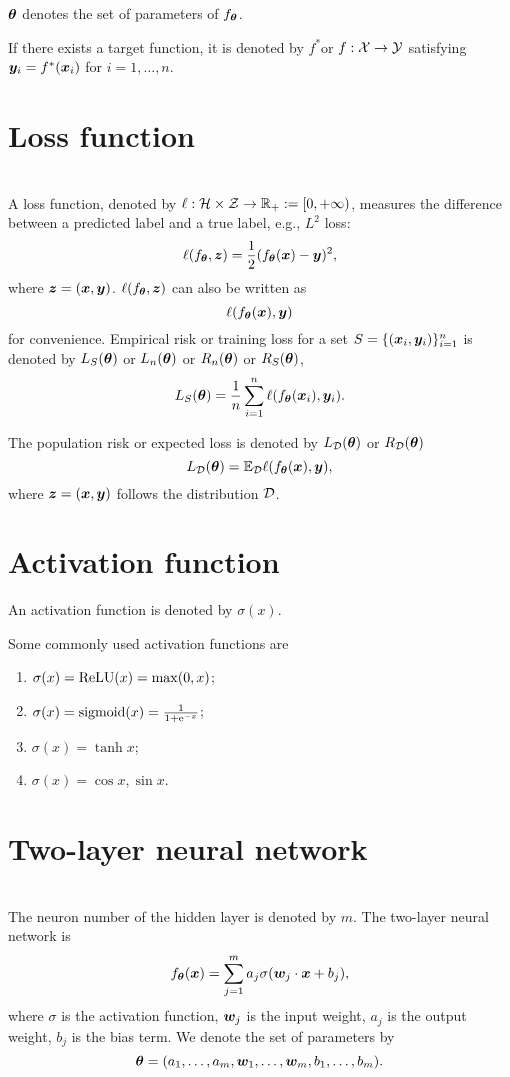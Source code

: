 \documentclass{article}
\begin{document}
$\bm{\theta}$  denotes the set of parameters of  $f_{\bm{\theta}}$.

If there exists a target function, it is denoted by $f^*$or $f:\mathcal{X}\to\mathcal{Y}$ satisfying $\bm{y}_i=f^*(\bm{x}_i)$ for $i=1,\ldots,n$.

\section{Loss function}~\\
A loss function, denoted by $\ell:\mathcal{H}\times\mathcal{Z}\to\mathbb{R}_+:=[0,+\infty)$, measures the difference between a predicted label and a true label, e.g., $L^2$ loss:
\[
    \ell(f_{\bm{\theta}},\bm{z})=\frac{1}{2}(f_{\bm{\theta}}(\bm{x})-\bm{y})^2,
\]
where $\bm{z}=(\bm{x},\bm{y})$. $\ell(f_{\bm{\theta}},\bm{z})$ can also be written as
\[
    \ell(f_{\bm{\theta}}(\bm{x}),\bm{y})
\]
for convenience.
Empirical risk or training loss for a set $S=\{(\bm{x}_i,\bm{y}_i)\}_{i=1}^{n}$ is denoted by   $L_S(\bm{\theta})$ or $L_{n}(\bm{\theta})$ or $R_{n}(\bm{\theta})$ or $R_{S}(\bm{\theta})$,
\begin{equation}
    L_S(\bm{\theta}) =\frac{1}{n}\sum_{i=1}^n\ell(f_{\bm{\theta}}(\bm{x}_i),\bm{y}_i).
\end{equation}


The population risk or expected loss is denoted by $L_{\mathcal{D}}(\bm{\theta})$ or $R_{\mathcal{D}}(\bm{\theta})$
\begin{equation}
    L_{\mathcal{D}}(\bm{\theta}) =\mathbb{E}_{\mathcal{D}}\ell(f_{\bm{\theta}}(\bm{x}),\bm{y}),
\end{equation}
where $\bm{z}=(\bm{x},\bm{y})$ follows the distribution $\mathcal{D}$.

\section{Activation function}
An activation function is denoted by $\sigma(x)$.
\begin{exam}
    Some commonly used activation functions are
    \begin{enumerate}
        \item $\sigma(x) = \mathrm{ReLU} (x) = \max (0, x)$;
        \item $\sigma(x) ={\rm sigmoid}(x)= \frac{1}{1 + \mathrm{e}^{-x}}$;
        \item $\sigma(x) = \tanh x$;
        \item $\sigma(x) = \cos x, \sin x$.
    \end{enumerate}
\end{exam}


\section{Two-layer neural network}~\\
The neuron number of the hidden layer is denoted by $m$. The two-layer neural network is
\begin{equation}
    f_{\bm{\theta}}(\bm{x})=\sum_{j=1}^{m} a_j \sigma (\bm{w}_j\cdot \bm{x} + b_j),
\end{equation}
where $\sigma$ is the activation function, $\bm{w}_j$ is the input weight, $a_j$ is the output weight, $b_j$ is the bias term. We denote the set of parameters by
\[
    \bm{\theta}=(a_1,\ldots,a_m,\bm{w}_1,\ldots,\bm{w}_m,b_1,\ldots,b_m).
\]
\end{document}

